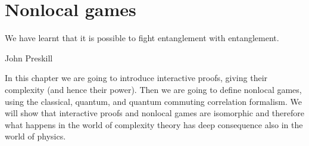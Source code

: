 \section{Nonlocal games}
\epigraph{We have learnt that it is possible to fight entanglement with entanglement.}{John Preskill}

In this chapter we are going to introduce interactive proofs, giving their complexity (and hence their power). Then we are going to define nonlocal games, using the classical, quantum, and quantum commuting correlation formalism. We will show that interactive proofs and nonlocal games are isomorphic and therefore what happens in the world of complexity theory has deep consequence also in the world of physics.

